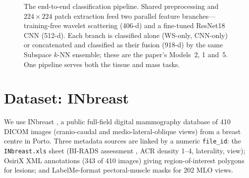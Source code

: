 \begin{figure}[t]
{%
}
\caption[End-to-end classification pipeline]{The end-to-end classification pipeline. Shared preprocessing and $224\times224$ patch extraction feed two parallel feature branches---training-free wavelet scattering (406-d) and a fine-tuned ResNet18 CNN (512-d). Each branch is classified alone (WS-only, CNN-only) or concatenated and classified as their fusion (918-d) by the same Subspace $k$-NN ensemble; these are the paper's Models~2, 1 and~5. One pipeline serves both the tissue and mass tasks.}
\label{fig:pipeline}
\end{figure}

\section{Dataset: INbreast} \label{sec:dataset}

We use INbreast \cite{moreira2012inbreast}, a public full-field digital mammography database of 410 DICOM images (cranio-caudal and medio-lateral-oblique views) from a breast centre in Porto. Three metadata sources are linked by a numeric \texttt{file\_id}: the \texttt{INbreast.xls} sheet (BI-RADS assessment \cite{sickles2013acr}, ACR density 1--4, laterality, view); OsiriX XML annotations (343 of 410 images) giving region-of-interest polygons for lesions; and LabelMe-format pectoral-muscle masks \cite{aliniya2023pectoral} for 202 MLO views.

